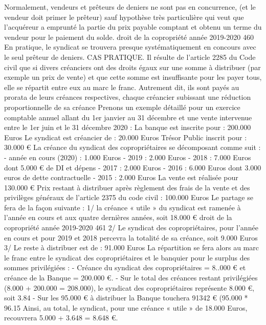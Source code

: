Normalement, vendeurs et prêteurs de deniers ne sont pas en concurrence, (et le vendeur doit primer le prêteur) sauf hypothèse très particulière qui veut que l'acquéreur a emprunté la partie du prix payable comptant et obtenu un terme du vendeur pour le paiement du solde.
droit de la copropriété année 2019-2020
460
En pratique, le syndicat se trouvera presque systématiquement en concours avec le seul prêteur de deniers.
CAS PRATIQUE.
Il résulte de l'article 2285 du Code civil que si divers créanciers ont des droits égaux sur une somme à distribuer (par exemple un prix de vente) et que cette somme est insuffisante pour les payer tous, elle se répartit entre eux au marc le franc. Autrement dit, ils sont payés au prorata de leurs créances respectives, chaque créancier subissant une réduction proportionnelle de sa créance
Prenons un exemple détaillé pour un exercice comptable annuel allant du 1er janvier au 31 décembre et une vente intervenue entre le 1er juin et le 31 décembre 2020 :
La banque est inscrite pour : 200.000 Euros
Le syndicat est créancier de : 20.000 Euros
Trésor Public inscrit pour : 30.000 €
La créance du syndicat des copropriétaires se décomposant comme suit :
- année en cours (2020) : 1.000 Euros
- 2019 : 2.000 Euros
- 2018 : 7.000 Euros dont 5.000 € de DI et dépens
- 2017 : 2.000 Euros
- 2016 : 6.000 Euros dont 3.000 euros de dette contractuelle
- 2015 : 2.000 Euros
La vente est réalisée pour 130.000 €
Prix restant à distribuer après règlement des frais de la vente et des privilèges généraux de l’article 2375 du code civil : 100.000 Euros
Le partage se fera de la façon suivante :
1\degres/ la créance « utile » du syndicat est ramenée à l’année en cours et aux quatre dernières années, soit 18.000 €
droit de la copropriété année 2019-2020
461
2\degres/ Le syndicat des copropriétaires, pour l’année en cours et pour 2019 et 2018 percevra la totalité de sa créance, soit 9.000 Euros
3\degres/ Le reste à distribuer est de : 91.000 Euros
La répartition se fera alors au marc le franc entre le syndicat des copropriétaires et le banquier pour le surplus des sommes privilégiées :
- Créance du syndicat des copropriétaires = 8..000 € et créance de la Banque = 200.000 €.
- Sur le total des créances restant privilégiées (8.000 + 200.000 = 208.000), le syndicat des copropriétaires représente 8.000 €, soit 3.84 %
- Sur les 95.000 € à distribuer la Banque touchera 91342 € (95.000 * 96.15%
Ainsi, au total, le syndicat, pour une créance « utile » de 18.000 Euros, recouvrera 5.000 + 3.648 = 8.648 €.
